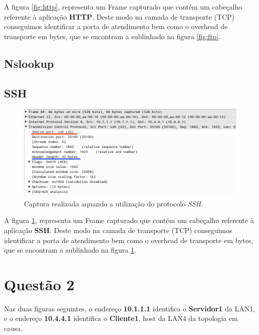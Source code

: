 \documentclass{llncs}
\begin{document}
A figura \ref{fig:http}, representa um Frame capturado que contém um cabeçalho referente à aplicação \textbf{HTTP}. Deste modo na camada de transporte (TCP) conseguimos identificar a porta de atendimento bem como o overhead de transporte em bytes, que se encontram a sublinhado na figura \ref{fig:ftp}.


\subsection{Nslookup}



\subsection{SSH}

\begin{figure}[H]
\begin{center}
\includegraphics[scale=0.4]{ssh.png}
\end{center}
\caption{\label{fig:ssh}Captura realizada aquando a utilização do protocolo \emph{SSH}.}
\end{figure}

A figura \ref{fig:ssh}, representa um Frame capturado que contém um cabeçalho referente à aplicação \textbf{SSH}. Deste modo na camada de transporte (TCP) conseguimos identificar a porta de atendimento bem como o overhead de transporte em bytes, que se encontram a sublinhado na figura \ref{fig:ssh}.


\section{Questão 2}

Nas duas figuras seguintes, o endereço \textbf{10.1.1.1} identifica o \textbf{Servidor1} da LAN1, e o endereço \textbf{10.4.4.1} identifica o \textbf{Cliente1}, host da LAN4 da topologia em causa.
\end{document}

